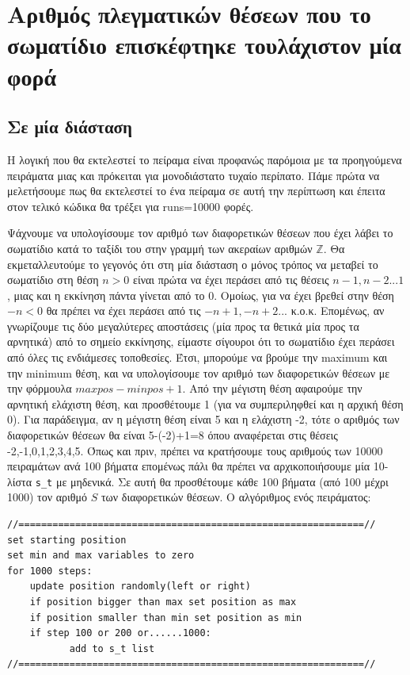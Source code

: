 \section{Αριθμός πλεγματικών θέσεων που το σωματίδιο επισκέφτηκε τουλάχιστον μία φορά}
\subsection{Σε μία διάσταση}
\label{S1D}
Η λογική που θα εκτελεστεί το πείραμα είναι προφανώς παρόμοια με τα προηγούμενα πειράματα μιας και πρόκειται για μονοδιάστατο τυχαίο περίπατο. Πάμε πρώτα να μελετήσουμε πως θα εκτελεστεί το ένα πείραμα σε αυτή την περίπτωση και έπειτα στον τελικό κώδικα θα τρέξει για {\en runs}=10000 φορές. 

Ψάχνουμε να υπολογίσουμε τον αριθμό των διαφορετικών θέσεων που έχει λάβει το σωματίδιο κατά το ταξίδι του στην γραμμή των ακεραίων αριθμών $\mathbb{Z}$. Θα εκμεταλλευτούμε το γεγονός ότι στη μία διάσταση ο μόνος τρόπος να μεταβεί το σωματίδιο στη θέση $n>0$ είναι πρώτα να έχει περάσει από τις θέσεις $n-1,n-2...1$, μιας και η εκκίνηση πάντα γίνεται από το $0$. Ομοίως, για να έχει βρεθεί στην θέση $-n<0$ θα πρέπει να έχει περάσει από τις $-n+1,-n+2...$ κ.ο.κ. Επομένως, αν γνωρίζουμε τις δύο μεγαλύτερες αποστάσεις (μία προς τα θετικά μία προς τα αρνητικά) από το σημείο εκκίνησης, είμαστε σίγουροι ότι το σωματίδιο έχει περάσει από όλες τις ενδιάμεσες τοποθεσίες. Έτσι, μπορούμε να βρούμε την {\en maximum} και την {\en minimum} θέση, και να υπολογίσουμε τον αριθμό των διαφορετικών θέσεων με την φόρμουλα $maxpos-minpos+1$. Από την μέγιστη θέση αφαιρούμε την αρνητική ελάχιστη θέση, και προσθέτουμε 1 (για να συμπεριληφθεί και η αρχική θέση 0). Για παράδειγμα, αν η μέγιστη θέση είναι 5 και η ελάχιστη -2, τότε ο αριθμός των διαφορετικών θέσεων θα είναι 5-(-2)+1=8 όπου αναφέρεται στις θέσεις -2,-1,0,1,2,3,4,5.
Όπως και πριν, πρέπει να κρατήσουμε τους αριθμούς των 10000 πειραμάτων ανά 100 βήματα επομένως πάλι θα πρέπει να αρχικοποιήσουμε μία 10-λίστα {\en \texttt{s\_t}} με μηδενικά. Σε αυτή θα προσθέτουμε κάθε 100 βήματα (από 100 μέχρι 1000) τον αριθμό $S$ των διαφορετικών θέσεων. 
Ο αλγόριθμος ενός πειράματος: 
\en
\begin{lstlisting}
//=============================================================//
set starting position
set min and max variables to zero
for 1000 steps:
    update position randomly(left or right)
    if position bigger than max set position as max
    if position smaller than min set position as min
    if step 100 or 200 or......1000:
           add to s_t list
//=============================================================//
\end{lstlisting}
